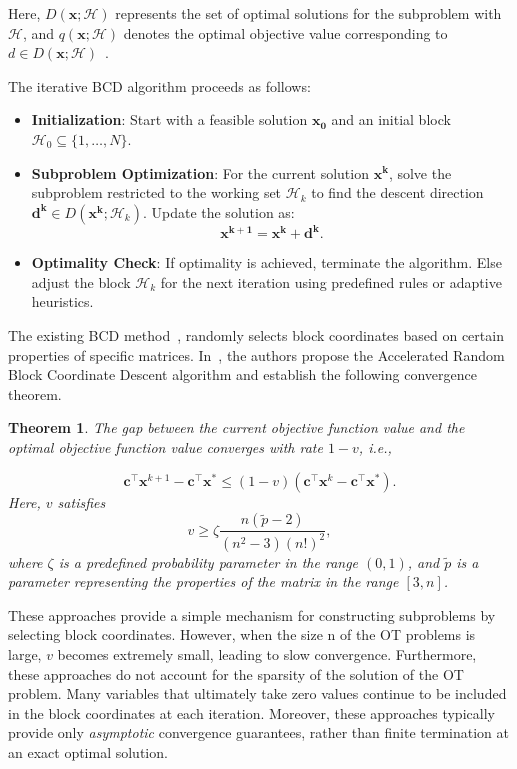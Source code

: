 \documentclass[12pt,a4paper]{article}
\newtheorem{theorem}{Theorem} %
\begin{document}
Here, \( D(\mathbf{x}; \mathcal{H}) \) represents the set of optimal solutions for the subproblem with \( \mathcal{H} \), and \( q(\mathbf{x}; \mathcal{H}) \) denotes the optimal objective value corresponding to \( d \in D(\mathbf{x}; \mathcal{H}) \)~\cite{tseng2009block}.

The iterative BCD algorithm proceeds as follows:
\begin{itemize}
    \item \textbf{Initialization}: Start with a feasible solution \(\mathbf{x_0} \) and an initial block \(\mathcal{H}_0 \subseteq \{1, \dots, N\}\).
    \item \textbf{Subproblem Optimization}: For the current solution \(\mathbf{x^k}\), solve the subproblem restricted to the working set \(\mathcal{H}_k\) to find the descent direction \(\mathbf{d^k}  \in D(\mathbf{x^k}; \mathcal{H}_k)\). Update the solution as:
    \[
    \mathbf{x^{k+1}} =\mathbf{x^k}  +\mathbf{d^k}.
    \]
    \item \textbf{Optimality Check}: If optimality is achieved, terminate the algorithm. Else adjust the block \(\mathcal{H}_k\) for the next iteration using predefined rules or adaptive heuristics.
\end{itemize}

The existing BCD method~\cite{xie2023randomized}, randomly selects block coordinates based on certain properties of specific matrices.
In~\cite{xie2023randomized}, the authors propose the Accelerated Random Block Coordinate Descent algorithm and establish the following convergence theorem.

\begin{theorem}
The gap between the current objective function value and the optimal objective function value converges with rate \( 1 - v \), i.e.,

\[
\mathbf{c}^{\top} \mathbf{x}^{k+1} - \mathbf{c}^{\top} \mathbf{x}^* \leq (1 - v)(\mathbf{c}^{\top} \mathbf{x}^k - \mathbf{c}^{\top} \mathbf{x}^*).
\]
Here, \( v \) satisfies
\[
v \geq \zeta \frac{n ( \tilde{p} - 2 )}{(n^2 - 3)(n!)^2},
\]
where \( \zeta \) is a predefined probability parameter in the range \( (0,1) \), and \( \tilde{p} \) is a parameter representing the properties of the matrix in the range \( [3, n] \).
\end{theorem}


These approaches provide a simple mechanism for constructing subproblems by selecting block coordinates. However, when the size n of the OT problems is large, \( v \) becomes extremely small, leading to slow convergence.
Furthermore, these approaches do not account for the sparsity of the solution of the OT problem. Many variables that ultimately take zero values continue to be included in the block coordinates at each iteration. Moreover, these approaches typically provide only \emph{asymptotic} convergence guarantees,
rather than finite termination at an exact optimal solution.
\end{document}
